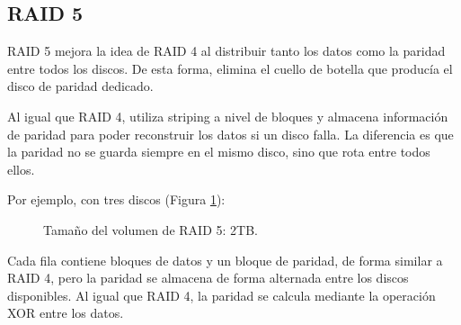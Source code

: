\subsection{RAID 5}

RAID 5 mejora la idea de RAID 4 al distribuir tanto los datos como la paridad entre todos los discos. De esta forma, elimina el cuello de botella que producía el disco de paridad dedicado.

Al igual que RAID 4, utiliza striping a nivel de bloques y almacena información de paridad para poder reconstruir los datos si un disco falla. La diferencia es que la paridad no se guarda siempre en el mismo disco, sino que rota entre todos ellos.

Por ejemplo, con tres discos (Figura \ref{fig:raid5}):
\begin{figure}[!ht]
  \centering
  \caption{Tamaño del volumen de RAID 5: 2TB.}
  \label{fig:raid5}
\end{figure}
Cada fila contiene bloques de datos y un bloque de paridad, de forma similar a RAID 4, pero la paridad se almacena de forma alternada entre los discos disponibles. Al igual que RAID 4, la paridad se calcula mediante la operación XOR entre los datos.

